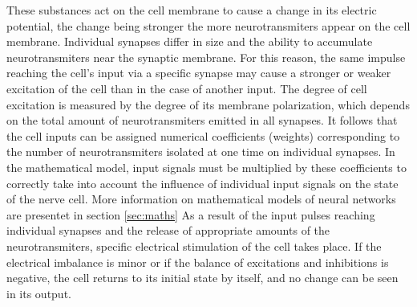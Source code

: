 These substances act on the cell membrane to cause a change in its electric potential, 
the change being stronger the more neurotransmiters appear on the cell membrane.
Individual synapses differ in size and the ability to accumulate neurotransmiters near the synaptic
membrane. 
For this reason, the same impulse reaching the cell's input via a specific synapse may cause a
stronger or weaker excitation of the cell than in the case of another input.
The degree of cell excitation is measured by the degree of its membrane polarization,
which depends on the total amount of neurotransmiters emitted in all synapses.
It follows that the cell inputs can be assigned numerical coefficients (weights) corresponding to 
the number of neurotransmiters isolated at one time on individual synapses.
In the mathematical model, input signals must be multiplied by these coefficients to correctly 
take into account the influence of individual input signals on the state of the nerve cell.
More information on mathematical models of neural networks are presentet in section \ref{sec:maths}
As a result of the input pulses reaching individual synapses and the release of appropriate
amounts of the neurotransmiters, specific electrical stimulation of the cell takes place.
If the electrical imbalance is minor or if the balance of excitations and inhibitions is negative,
the cell returns to its initial state by itself, and no change can be seen in its output.

